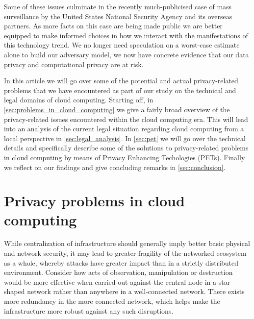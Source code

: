 \documentclass[12pt]{article}
\begin{document}
Some of these issues culminate in the recently much-publicised case of mass surveillance by the United States National Security Agency and its overseas partners.
As more facts on this case are being made public we are better equipped to make informed choices in how we interact with the manifestations of this technology trend.
We no longer need speculation on a worst-case estimate alone to build our adversary model, we now have concrete evidence that our data privacy and computational privacy are at risk.

In this article we will go over some of the potential and actual privacy-related problems that we have encountered as part of our study on the technical and legal domains of cloud computing. Starting off, in \autoref{sec:problems_in_cloud_computing} we give a fairly broad overview of the privacy-related issues encountered within the cloud computing era.
This will lead into an analysis of the current legal situation regarding cloud computing from a local perspective in \autoref{sec:legal_analysis}. In \autoref{sec:pet} we will go over the technical details and specifically describe some of the solutions to privacy-related problems in cloud computing by means of Privacy Enhancing Techologies (PETs). Finally we reflect on our findings and give concluding remarks in \autoref{sec:conclusion}.

\section{Privacy problems in cloud computing}
\label{sec:problems_in_cloud_computing}

While centralization of infrastructure should generally imply better basic physical and network security, it may lead to greater fragility of the networked ecosystem as a whole, whereby attacks have greater impact than in a strictly distributed environment.
Consider how acts of observation, manipulation or destruction would be more effective when carried out against the central node in a star-shaped network rather than anywhere in a well-connected network.
There exists more redundancy in the more connected network, which helps make the infrastructure more robust against any such disruptions.
\end{document}
